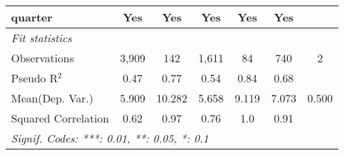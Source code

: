 \begin{tabular}{lcccccc}
   quarter                                                    & Yes           & Yes          & Yes          & Yes     & Yes          & \\  
   \midrule
   \emph{Fit statistics}\\
   Observations                                               & 3,909         & 142          & 1,611        & 84      & 740          & 2\\  
   Pseudo R$^2$                                               & 0.47          & 0.77         & 0.54         & 0.84    & 0.68         & \\  
Mean(Dep. Var.) & 5.909 & 10.282 & 5.658 & 9.119 & 7.073 & 0.500 \\
   Squared Correlation                                        & 0.62          & 0.97         & 0.76         & 1.0     & 0.91         & \\  
   \midrule \midrule
   \multicolumn{7}{l}{\emph{Signif. Codes: ***: 0.01, **: 0.05, *: 0.1}}\\
\end{tabular}
\par\endgroup
